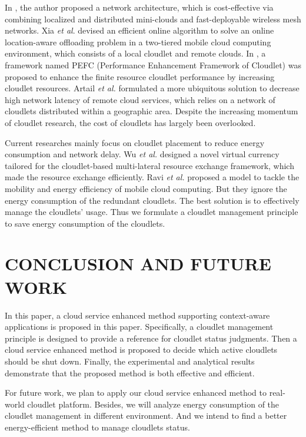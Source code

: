 \documentclass{llncs}
\begin{document}
In \cite{khan:wang}, the author proposed a network architecture, which is cost-effective via combining localized and distributed mini-clouds and fast-deployable wireless mesh networks. Xia \emph{et al}. \cite{xia:liang} devised an efficient online algorithm to solve an online location-aware offloading problem in a two-tiered mobile cloud computing environment, which consists of a local cloudlet and remote clouds. In \cite{whaiduzzaman}, a framework named PEFC (Performance Enhancement Framework of Cloudlet) was proposed to enhance the finite resource cloudlet performance by increasing cloudlet resources. Artail \emph{et al.} \cite{artail:frenn} formulated a more ubiquitous solution to decrease high network latency of remote cloud services, which relies on a network of cloudlets distributed within a geographic area. Despite the increasing momentum of cloudlet research, the cost of cloudlets has largely been overlooked.

Current researches mainly focus on cloudlet placement to reduce energy consumption and network delay. Wu \emph{et al.} \cite{wu:ying} designed a novel virtual currency tailored for the cloudlet-based multi-lateral resource exchange framework, which made the resource exchange efficiently. Ravi \emph{et al.} \cite{ravi:peddoju} proposed a model to tackle the mobility and energy efficiency of mobile cloud computing. But they ignore the energy consumption of the redundant cloudlets. The best solution is to effectively manage the cloudlets’ usage. Thus we formulate a cloudlet management principle to save energy consumption of the cloudlets.

\section{CONCLUSION AND FUTURE WORK}

In this paper, a cloud service enhanced method supporting context-aware applications is proposed in this paper. Specifically, a cloudlet management principle is designed to provide a reference for cloudlet status judgments. Then a cloud service enhanced method is proposed to decide which active cloudlets should be shut down. Finally, the experimental and analytical results demonstrate that the proposed method is both effective and efficient.

For future work, we plan to apply our cloud service enhanced method to real-world cloudlet platform. Besides, we will analyze energy consumption of the cloudlet management in different environment. And we intend to find a better energy-efficient method to manage cloudlets status.
\end{document}
